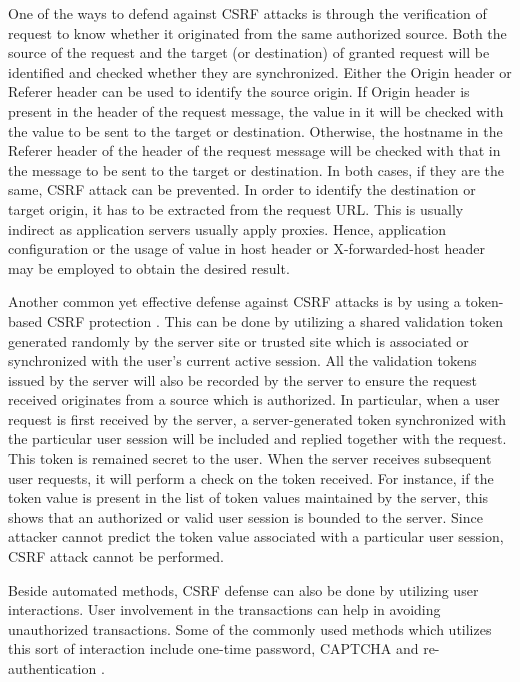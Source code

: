 \documentclass[runningheads]{llncs}
\begin{document}
One of the ways to defend against CSRF attacks is through the verification of request to know whether it originated from the same authorized source. Both the source of the request and the target (or destination) of granted request will be identified and checked whether they are synchronized. Either the Origin header or Referer header can be used to identify the source origin. If Origin header is present in the header of the request message, the value in it will be checked with the value to be sent to the target or destination. Otherwise, the hostname in the Referer header of the header of the request message will be checked with that in the message to be sent to the target or destination. In both cases, if they are the same, CSRF attack can be prevented. In order to identify the destination or target origin, it has to be extracted from the request URL. This is usually indirect as application servers usually apply proxies. Hence, application configuration or the usage of value in host header or X-forwarded-host header may be employed to obtain the desired result.

Another common yet effective defense against CSRF attacks is by using a token-based CSRF protection \cite{barth_jackson_mitchell_2008}. This can be done by utilizing a shared validation token generated randomly by the server site or trusted site which is associated or synchronized with the user’s current active session. All the validation tokens issued by the server will also be recorded by the server to ensure the request received originates from a source which is authorized. In particular, when a user request is first received by the server, a server-generated token synchronized with the particular user session will be included and replied together with the request. This token is remained secret to the user. When the server receives subsequent user requests, it will perform a check on the token received. For instance, if the token value is present in the list of token values maintained by the server, this shows that an authorized or valid user session is bounded to the server. Since attacker cannot predict the token value associated with a particular user session, CSRF attack cannot be performed.

Beside automated methods, CSRF defense can also be done by utilizing user interactions. User involvement in the transactions can help in avoiding unauthorized transactions. Some of the commonly used methods which utilizes this sort of interaction include one-time password, CAPTCHA and re-authentication \cite{yadav_parekh_2017}.
%
\end{document}
